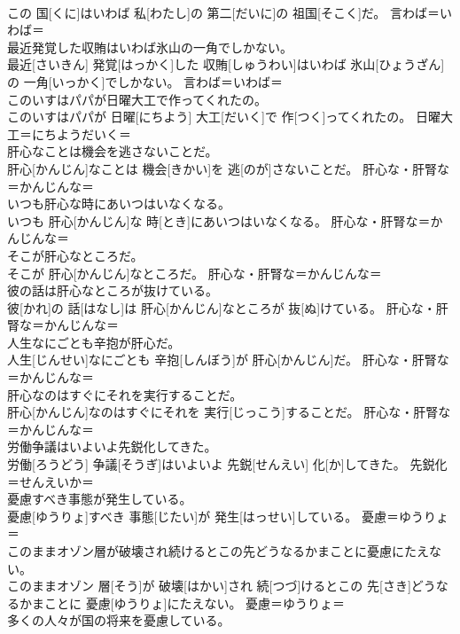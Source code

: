 \documentclass[8pt]{extreport}
\begin{document}
\begin{CJK}{UTF8}{min}
{\\	この 国[くに]はいわば 私[わたし]の 第二[だいに]の 祖国[そこく]だ。	言わば＝いわば＝ 
\\	最近発覚した収賄はいわば氷山の一角でしかない。	
\\	最近[さいきん] 発覚[はっかく]した 収賄[しゅうわい]はいわば 氷山[ひょうざん]の 一角[いっかく]でしかない。	言わば＝いわば＝ 
\\	このいすはパパが日曜大工で作ってくれたの。	
\\	このいすはパパが 日曜[にちよう] 大工[だいく]で 作[つく]ってくれたの。	日曜大工＝にちようだいく＝ 
\\	肝心なことは機会を逃さないことだ。	
\\	肝心[かんじん]なことは 機会[きかい]を 逃[のが]さないことだ。	肝心な・肝腎な＝かんじんな＝ 
\\	いつも肝心な時にあいつはいなくなる。	
\\	いつも 肝心[かんじん]な 時[とき]にあいつはいなくなる。	肝心な・肝腎な＝かんじんな＝ 
\\	そこが肝心なところだ。	
\\	そこが 肝心[かんじん]なところだ。	肝心な・肝腎な＝かんじんな＝ 
\\	彼の話は肝心なところが抜けている。	
\\	彼[かれ]の 話[はなし]は 肝心[かんじん]なところが 抜[ぬ]けている。	肝心な・肝腎な＝かんじんな＝ 
\\	人生なにごとも辛抱が肝心だ。	
\\	人生[じんせい]なにごとも 辛抱[しんぼう]が 肝心[かんじん]だ。	肝心な・肝腎な＝かんじんな＝ 
\\	肝心なのはすぐにそれを実行することだ。	
\\	肝心[かんじん]なのはすぐにそれを 実行[じっこう]することだ。	肝心な・肝腎な＝かんじんな＝ 
\\	労働争議はいよいよ先鋭化してきた。	
\\	労働[ろうどう] 争議[そうぎ]はいよいよ 先鋭[せんえい] 化[か]してきた。	先鋭化＝せんえいか＝ 
\\	憂慮すべき事態が発生している。	
\\	憂慮[ゆうりょ]すべき 事態[じたい]が 発生[はっせい]している。	憂慮＝ゆうりょ＝ 
\\	このままオゾン層が破壊され続けるとこの先どうなるかまことに憂慮にたえない。	
\\	このままオゾン 層[そう]が 破壊[はかい]され 続[つづ]けるとこの 先[さき]どうなるかまことに 憂慮[ゆうりょ]にたえない。	憂慮＝ゆうりょ＝ 
\\	多くの人々が国の将来を憂慮している。	
}
\end{CJK}
\end{document}
